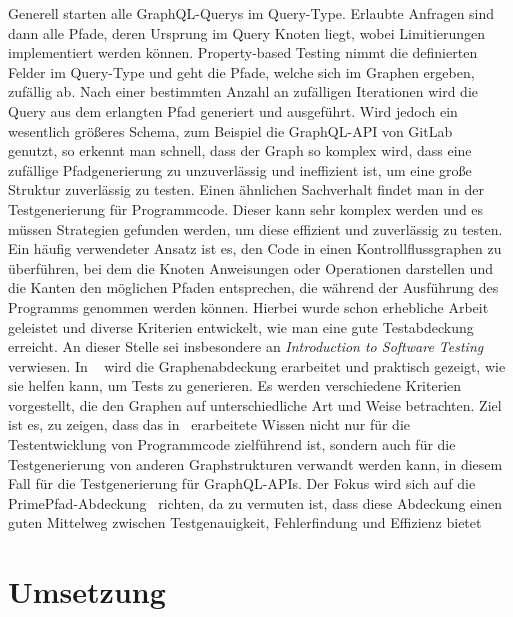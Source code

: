 Generell starten alle GraphQL-Querys im Query-Type.
Erlaubte Anfragen sind dann alle Pfade, deren Ursprung im Query Knoten liegt, wobei Limitierungen implementiert werden können.
Property-based Testing nimmt die definierten Felder im Query-Type und geht die Pfade, welche sich im Graphen ergeben, zufällig ab.
Nach einer bestimmten Anzahl an zufälligen Iterationen wird die Query aus dem erlangten Pfad generiert und ausgeführt.
Wird jedoch ein wesentlich größeres Schema, zum Beispiel die GraphQL-API von GitLab~\cite{gitlab} genutzt, so erkennt man schnell, dass
der Graph so komplex wird, dass eine zufällige Pfadgenerierung zu unzuverlässig und ineffizient ist, um
eine große Struktur zuverlässig zu testen.
Einen ähnlichen Sachverhalt findet man in der Testgenerierung für Programmcode.
Dieser kann sehr komplex werden und es müssen Strategien gefunden werden, um diese effizient und zuverlässig zu testen.
Ein häufig verwendeter Ansatz ist es, den Code in einen Kontrollflussgraphen zu überführen, bei dem die Knoten Anweisungen oder Operationen darstellen
und die Kanten den möglichen Pfaden entsprechen, die während der Ausführung des Programms genommen werden können.
Hierbei wurde schon erhebliche Arbeit geleistet und diverse Kriterien entwickelt, wie man eine gute Testabdeckung erreicht.
An dieser Stelle sei insbesondere an \textit{Introduction to Software Testing}~\cite{software-testing} verwiesen.
In ~\cite{software-testing} wird die Graphenabdeckung erarbeitet und praktisch gezeigt, wie sie helfen kann, um Tests zu generieren.
Es werden verschiedene Kriterien vorgestellt, die den Graphen auf unterschiedliche Art und Weise betrachten.
Ziel ist es, zu zeigen, dass das in~\cite{software-testing} erarbeitete Wissen nicht nur für die Testentwicklung von Programmcode zielführend ist,
sondern auch für die Testgenerierung von anderen Graphstrukturen verwandt werden kann, in diesem Fall für die Testgenerierung für GraphQL-APIs.
Der Fokus wird sich auf die PrimePfad-Abdeckung~\cite[vgl. Criterion 2.4]{software-testing} richten, da zu vermuten ist, dass diese
Abdeckung einen guten Mittelweg zwischen Testgenauigkeit, Fehlerfindung und Effizienz bietet

\section{Umsetzung}

